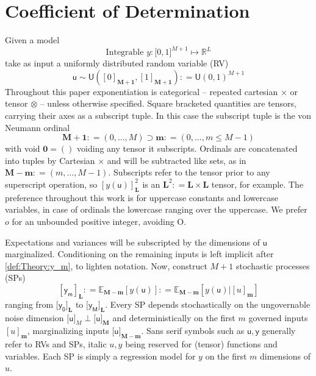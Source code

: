 \documentclass[preprint,12pt]{elsarticle}
\newcommand*{\M}[1]{\ensuremath{#1}\xspace}
\newcommand*{\x}{\times}
\newcommand*{\mi}[1]{\mathbf{#1}}
\newcommand*{\st}[1]{\mathbb{#1}}
\newcommand*{\rv}[1]{\mathsf{#1}}
\newcommand*{\te}[2][]{\left\lbrack{#2}\right\rbrack_{#1}}
\newcommand*{\tte}[2][]{\lbrack{#2}\rbrack_{#1}}
\newcommand*{\deq}{\M{\mathrel{\mathop:}=}}
\newcommand{\T}[1]{\text{#1}}
\newcommand*{\ev}[3][]{\mathbb{E}_{#3}^{#1}\!\left\lbrack{#2}\right\rbrack}
\newcommand*{\uni}[2]{\mathsf{U}\!\left({#1,#2}\right)}
\newcommand*{\uniti}{\lbrack 0,1\rbrack}
\begin{document}
\section{Coefficient of Determination}\label{sec:COD}
    Given a model
    \begin{equation*}
        \T{Integrable } y \colon \uniti^{M+1} \mapsto \st{R}^{L}
    \end{equation*}
    take as input a uniformly distributed random variable (RV)
    \begin{equation*}
        \rv{u} \sim \uni{\te[\mi{M+1}]{0}}{\te[\mi{M+1}]{1}} \deq \uni{0}{1}^{M+1}
    \end{equation*}
    Throughout this paper exponentiation is categorical -- repeated cartesian $\x$ or tensor $\otimes$ -- unless otherwise specified. Square bracketed quantities are tensors, carrying their axes as a subscript tuple. In this case the subscript tuple is the von Neumann ordinal
    \begin{equation*}
        \mi{M+1} \deq (0,\ldots,M) \supset \mi{m} \deq (0,\ldots,m \leq M-1)
    \end{equation*}
    with void $\mi{0}=()$ voiding any tensor it subscripts. Ordinals are concatenated into tuples by Cartesian $\times$ and will be subtracted like sets, as in $\mi{M-m} \deq (m,\ldots,M-1)$. 
    Subscripts refer to the tensor prior to any superscript operation, so $\te[\mi{L}]{y(\rv{u})}^{2}$ is an $\mi{L}^{2} \deq \mi{L\x L}$ tensor, for example.
    The preference throughout this work is for uppercase constants and lowercase variables, in case of ordinals the lowercase ranging over the uppercase. We prefer $o$ for an unbounded positive integer, avoiding O.

    Expectations and variances will be subscripted by the dimensions of $\rv{u}$ marginalized. Conditioning on the remaining inputs is left implicit after \cref{def:Theory:y_m}, to lighten notation.
    Now, construct $M+1$ stochastic processes (SPs)
    \begin{equation}\label{def:Theory:y_m}
        \te[\mi{L}]{\rv{y_m}} \deq \ev{y(\rv{u})}{\mi{M-m}} \deq \ev{y(\rv{u}) \big\vert \te[\mi{m}]{u}}{\mi{M-m}}
    \end{equation}
    ranging from $\tte[\mi{L}]{\rv{y_0}}$ to $\tte[\mi{L}]{\rv{y_M}}$. Every SP depends stochastically on the ungovernable noise dimension $\tte[M]{\rv{u}} \perp \tte[\mi{M}]{\rv{u}}$ and deterministically on the first $m$ governed inputs $\te[\mi{m}]{u}$, marginalizing inputs $\tte[\mi{M-m}]{\rv{u}}$. 
    Sans serif symbols such as $\rv{u,y}$ generally refer to RVs and SPs, italic $u,y$ being reserved for (tensor) functions and variables. Each SP is simply a regression model for $y$ on the first $m$ dimensions of $u$.
    
\end{document}
